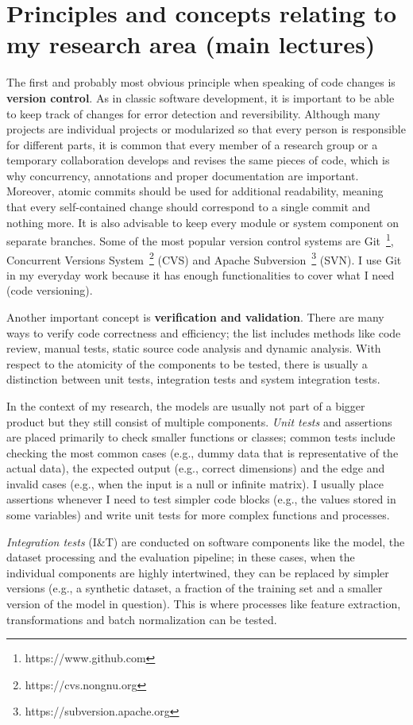 \documentclass[11pt]{article}
\begin{document}
\section{Principles and concepts relating to my research area (main lectures)}

The first and probably most obvious principle when speaking of code changes is \textbf{version control}. As in classic software development, it is important to be able to keep track of changes for error detection and reversibility. Although many projects are individual projects or modularized so that every person is responsible for different parts, it is common that every member of a research group or a temporary collaboration develops and revises the same pieces of code, which is why concurrency, annotations and proper documentation are important. Moreover, atomic commits should be used for additional readability, meaning that every self-contained change should correspond to a single commit and nothing more. It is also advisable to keep every module or system component on separate branches. Some of the most popular version control systems are Git~\footnote{https://www.github.com}, Concurrent Versions System~\footnote{https://cvs.nongnu.org} (CVS) and Apache Subversion~\footnote{https://subversion.apache.org} (SVN). I use Git in my everyday work because it has enough functionalities to cover what I need (code versioning).

Another important concept is \textbf{verification and validation}. There are many ways to verify code correctness and efficiency; the list includes methods like code review, manual tests, static source code analysis and dynamic analysis. With respect to the atomicity of the components to be tested, there is usually a distinction between unit tests, integration tests and system integration tests.

In the context of my research, the models are usually not part of a bigger product but they still consist of multiple components.
\textit{Unit tests} and assertions are placed primarily to check smaller functions or classes; common tests include checking the most common cases (e.g., dummy data that is representative of the actual data), the expected output (e.g., correct dimensions) and the edge and invalid cases (e.g., when the input is a null or infinite matrix). I usually place assertions whenever I need to test simpler code blocks (e.g., the values stored in some variables) and write unit tests for more complex functions and processes.

\textit{Integration tests} (I\&T) are conducted on software components like the model, the dataset processing and the evaluation pipeline; in these cases, when the individual components are highly intertwined, they can be replaced by simpler versions (e.g., a synthetic dataset, a fraction of the training set and a smaller version of the model in question). This is where processes like feature extraction, transformations and batch normalization can be tested.
\end{document}
